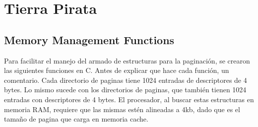 \section{Tierra Pirata}

\subsection{Memory Management Functions}
Para facilitar el manejo del armado de estructuras para la paginación, se crearon las siguientes funciones en C. Antes de explicar que hace cada función, un comentario. Cada directorio de paginas tiene 1024 entradas de descriptores de 4 bytes. Lo mismo sucede con los directorios de paginas, que también tienen 1024 entradas con descriptores de 4 bytes. El procesador, al buscar estas estructuras en memoria RAM, requiere que las mismas estén alineadas a 4kb, dado que es el tamaño de pagina que carga en memoria cache.

